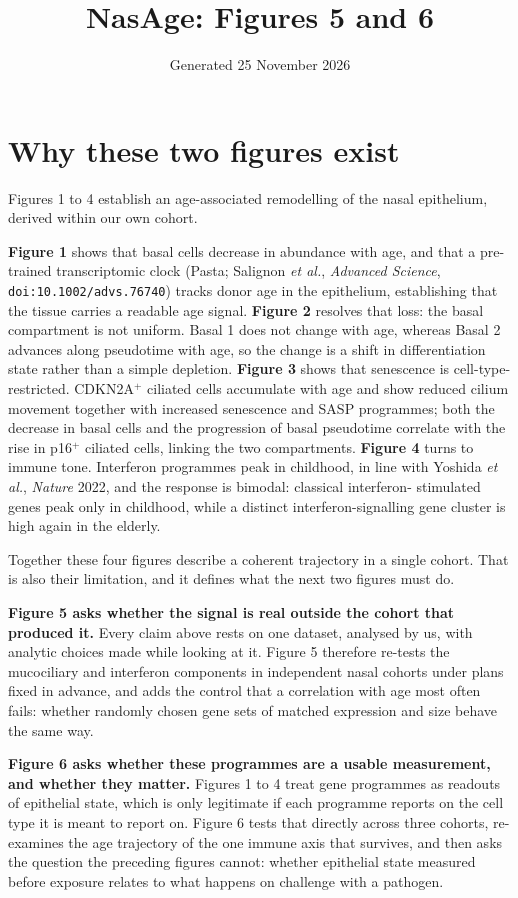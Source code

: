 \documentclass[11pt,a4paper]{article}
\title{NasAge: Figures 5 and 6}
\author{}
\date{Generated 25 November 2026}
\begin{document}
\maketitle

\section*{Why these two figures exist}

Figures 1 to 4 establish an age-associated remodelling of the nasal epithelium, derived
within our own cohort.

\textbf{Figure 1} shows that basal cells decrease in abundance with age, and that a
pre-trained transcriptomic clock (Pasta; Salignon \emph{et al.}, \emph{Advanced Science},
\texttt{doi:10.1002/advs.76740}) tracks donor age in the epithelium, establishing that the
tissue carries a readable age signal.
\textbf{Figure 2} resolves that loss: the basal compartment is not uniform. Basal 1 does not
change with age, whereas Basal 2 advances along pseudotime with age, so the change is a
shift in differentiation state rather than a simple depletion.
\textbf{Figure 3} shows that senescence is cell-type-restricted. CDKN2A$^{+}$ ciliated cells
accumulate with age and show reduced cilium movement together with increased senescence and
SASP programmes; both the decrease in basal cells and the progression of basal pseudotime
correlate with the rise in p16$^{+}$ ciliated cells, linking the two compartments.
\textbf{Figure 4} turns to immune tone. Interferon programmes peak in childhood, in line with
Yoshida \emph{et al.}, \emph{Nature} 2022, and the response is bimodal: classical interferon-
stimulated genes peak only in childhood, while a distinct interferon-signalling gene cluster
is high again in the elderly.

Together these four figures describe a coherent trajectory in a single cohort. That is also
their limitation, and it defines what the next two figures must do.

\textbf{Figure 5 asks whether the signal is real outside the cohort that produced it.} Every
claim above rests on one dataset, analysed by us, with analytic choices made while looking at
it. Figure 5 therefore re-tests the mucociliary and interferon components in independent
nasal cohorts under plans fixed in advance, and adds the control that a correlation with age
most often fails: whether randomly chosen gene sets of matched expression and size behave the
same way.

\textbf{Figure 6 asks whether these programmes are a usable measurement, and whether they
matter.} Figures 1 to 4 treat gene programmes as readouts of epithelial state, which is only
legitimate if each programme reports on the cell type it is meant to report on. Figure 6
tests that directly across three cohorts, re-examines the age trajectory of the one immune
axis that survives, and then asks the question the preceding figures cannot: whether
epithelial state measured before exposure relates to what happens on challenge with a
pathogen.
\end{document}
